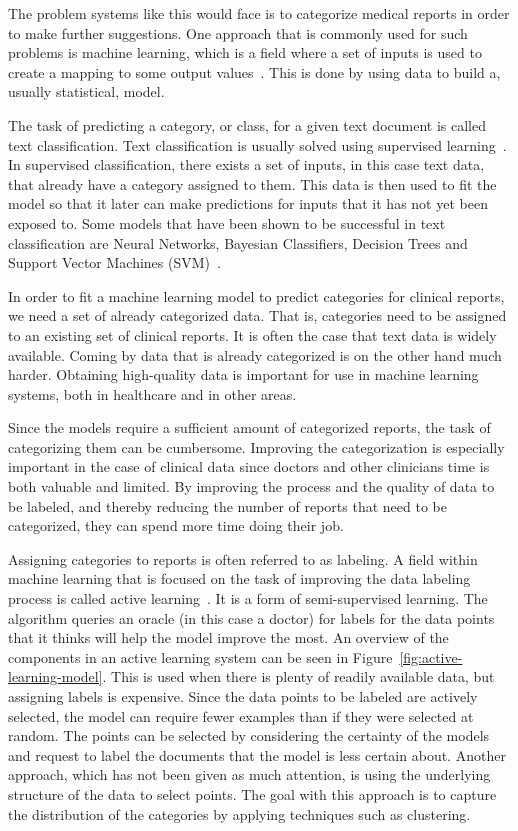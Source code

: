 The problem systems like this would face is to categorize medical reports in order to make further suggestions.
One approach that is commonly used for such problems is machine learning, which is a field where a set of inputs is used to create a mapping to some output values~\cite{bishop2006pattern}.
This is done by using data to build a, usually statistical, model.

The task of predicting a category, or class, for a given text document is called text classification.
Text classification is usually solved using supervised learning~\cite{aggarwal2012surveyclass}. 
In supervised classification, there exists a set of inputs, in this case text data, that already have a category assigned to them.
This data is then used to fit the model so that it later can make predictions for inputs that it has not yet been exposed to.
Some models that have been shown to be successful in text classification are Neural Networks, Bayesian Classifiers, Decision Trees and Support Vector Machines (SVM)~\cite{aggarwal2012surveyclass,joachims1998text, aggarwal2012surveyclass, tong2001support}.

In order to fit a machine learning model to predict categories for clinical reports, we need a set of already categorized data.
That is, categories need to be assigned to an existing set of clinical reports.
It is often the case that text data is widely available.
Coming by data that is already categorized is on the other hand much harder.
Obtaining high-quality data is important for use in machine learning systems, both in healthcare and in other areas.

Since the models require a sufficient amount of categorized reports, the task of categorizing them can be cumbersome.
Improving the categorization is especially important in the case of clinical data since doctors and other clinicians time is both valuable and limited.
By improving the process and the quality of data to be labeled, and thereby reducing the number of reports that need to be categorized, they can spend more time doing their job.

Assigning categories to reports is often referred to as labeling.
A field within machine learning that is focused on the task of improving the data labeling process is called active learning~\cite{settles2012active}.
It is a form of semi-supervised learning.
The algorithm queries an oracle (in this case a doctor) for labels for the data points that it thinks will help the model improve the most.
An overview of the components in an active learning system can be seen in Figure~\ref{fig:active-learning-model}.
This is used when there is plenty of readily available data, but assigning labels is expensive.
Since the data points to be labeled are actively selected, the model can require fewer examples than if they were selected at random.
The points can be selected by considering the certainty of the models and request to label the documents that the model is less certain about.
Another approach, which has not been given as much attention, is using the underlying structure of the data to select points.
The goal with this approach is to capture the distribution of the categories by applying techniques such as clustering.


